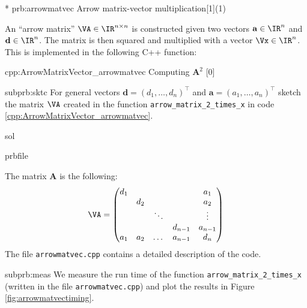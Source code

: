 
\begin{samproblem}*
  {prb:arrowmatvec}
  {Arrow matrix-vector multiplication}[1](1)
  {
    An ``arrow matrix'' $\VA \in \IR^{n \times n}$ is constructed given two vectors $\mathbf{a} \in \IR^n$ and $\mathbf{d} \in \IR^n$.
    The matrix is then squared and multiplied with a vector $\Vx \in \IR^n$. This is implemented in the
    following C++ function:
    \begin{samcode}[C++11-code]{cpp:ArrowMatrixVector_arrowmatvec}
      {Computing $\mathbf{A}^2$}
      [0]
    \end{samcode}
  }

  \begin{subproblem}{subprb:sktc}
  For general vectors $\mathbf{d} = (d_1, \dots, d_n)^\top$ and
  $\mathbf{a} = (a_1, \dots, a_n)^\top$
  sketch the matrix $\VA$ created in the function \texttt{arrow\_matrix\_2\_times\_x}
  in code \ref{cpp:ArrowMatrixVector_arrowmatvec}.

  \begin{samwriteprbpart}{sol}
    \begin{writeverbatim}{prbfile}
      \begin{samsolution}
        The matrix $\mathbf{A}$ is the following:
        \begin{align}
          \VA=\begin{pmatrix}
            d_1 &     &        &         & a_1     \\
            & d_2 &        &         & a_2     \\
            &     & \ddots &         & \vdots  \\
            &     &        & d_{n-1} & a_{n-1} \\
            a_1 & a_2 & \dots  & a_{n-1} & d_n     \\
          \end{pmatrix}
        \end{align}
        The file \texttt{arrowmatvec.cpp} contains a detailed description of the code.
      \end{samsolution}
    \end{writeverbatim}
  \end{samwriteprbpart}
\end{subproblem}

\begin{subproblem}{subprb:meas}
  We measure the run time of the function \texttt{arrow\_matrix\_2\_times\_x} (written in the
  file \texttt{arrowmatvec.cpp})
  and plot the results in Figure \ref{fig:arrowmatvectiming}.


\end{subproblem}
\end{samproblem}
